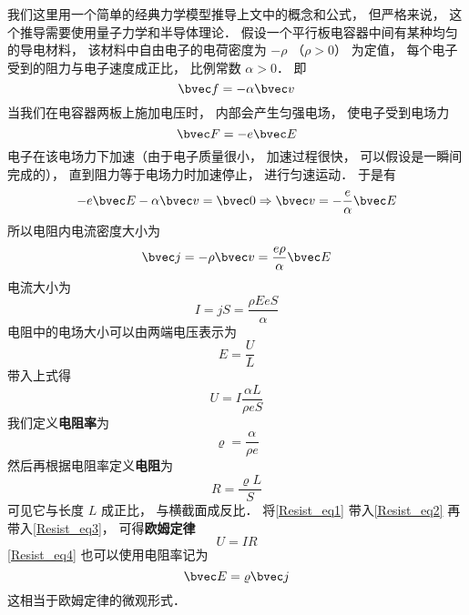 我们这里用一个简单的经典力学模型推导上文中的概念和公式， 但严格来说， 这个推导需要使用量子力学和半导体理论． 假设一个平行板电容器中间有某种均匀的导电材料， 该材料中自由电子的电荷密度为 $-\rho$ （$\rho > 0$） 为定值， 每个电子受到的阻力与电子速度成正比， 比例常数 $\alpha > 0$． 即
\begin{equation}
\bvec f = -\alpha \bvec v
\end{equation}
当我们在电容器两板上施加电压时， 内部会产生匀强电场， 使电子受到电场力
\begin{equation}
\bvec F = -e\bvec E
\end{equation}
电子在该电场力下加速（由于电子质量很小， 加速过程很快， 可以假设是一瞬间完成的）， 直到阻力等于电场力时加速停止， 进行匀速运动． 于是有
\begin{equation}
-e\bvec E - \alpha \bvec v = \bvec 0 \Rightarrow \bvec v = -\frac{e}{\alpha}\bvec E
\end{equation}
所以电阻内电流密度大小为
\begin{equation}\label{Resist_eq4}
\bvec j = -\rho \bvec v = \frac{e\rho}{\alpha}\bvec E
\end{equation}
电流大小为
\begin{equation}
I = jS = \frac{\rho EeS}{\alpha}
\end{equation}
电阻中的电场大小可以由两端电压表示为
\begin{equation}
E = \frac UL
\end{equation}
带入上式得
\begin{equation}\label{Resist_eq3}
U = I \frac{\alpha L}{\rho eS}
\end{equation}
我们定义\textbf{电阻率}为
\begin{equation}\label{Resist_eq1}
\varrho = \frac{\alpha}{\rho e}
\end{equation}
然后再根据电阻率定义\textbf{电阻}为
\begin{equation}\label{Resist_eq2}
R = \frac{\varrho L}{S}
\end{equation}
可见它与长度 $L$ 成正比， 与横截面成反比． 将\autoref{Resist_eq1} 带入\autoref{Resist_eq2} 再带入\autoref{Resist_eq3}， 可得\textbf{欧姆定律}
\begin{equation}
U = IR
\end{equation}
\autoref{Resist_eq4} 也可以使用电阻率记为
\begin{equation}
\bvec E = \varrho\bvec j
\end{equation}
这相当于欧姆定律的微观形式．

